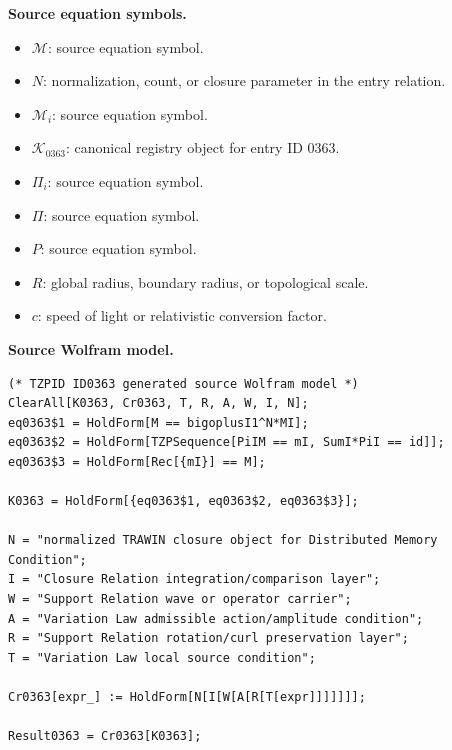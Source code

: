 \begin{minipage}[t]{0.49\linewidth}
\begingroup
\small
\raggedright
\textbf{Source equation symbols.}\par
\begin{itemize}[leftmargin=1.35em,itemsep=1pt,topsep=1pt,parsep=0pt]
    \item $\mathcal{M}$: source equation symbol.
    \item $N$: normalization, count, or closure parameter in the entry relation.
    \item $\mathcal{M}_{i}$: source equation symbol.
    \item $\mathcal{K}_{0363}$: canonical registry object for entry ID 0363.
    \item $\Pi_{i}$: source equation symbol.
    \item $\Pi$: source equation symbol.
    \item $P$: source equation symbol.
    \item $R$: global radius, boundary radius, or topological scale.
    \item $c$: speed of light or relativistic conversion factor.
\end{itemize}
\endgroup
\end{minipage}\hfill
\begin{minipage}[t]{0.47\linewidth}
\begingroup
\scriptsize
\raggedright
\textbf{Source Wolfram model.}\par
\begin{Verbatim}[fontsize=\tiny,breaklines=true,breakanywhere=true]
(* TZPID ID0363 generated source Wolfram model *)
ClearAll[K0363, Cr0363, T, R, A, W, I, N];
eq0363$1 = HoldForm[M == bigoplusI1^N*MI];
eq0363$2 = HoldForm[TZPSequence[PiIM == mI, SumI*PiI == id]];
eq0363$3 = HoldForm[Rec[{mI}] == M];

K0363 = HoldForm[{eq0363$1, eq0363$2, eq0363$3}];

N = "normalized TRAWIN closure object for Distributed Memory Condition";
I = "Closure Relation integration/comparison layer";
W = "Support Relation wave or operator carrier";
A = "Variation Law admissible action/amplitude condition";
R = "Support Relation rotation/curl preservation layer";
T = "Variation Law local source condition";

Cr0363[expr_] := HoldForm[N[I[W[A[R[T[expr]]]]]]];

Result0363 = Cr0363[K0363];
\end{Verbatim}
\endgroup
\end{minipage}

